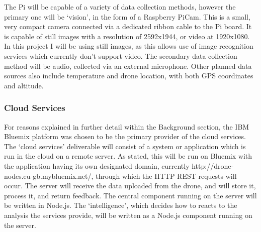 \documentclass{article}
\begin{document}
\vspace{\baselineskip} \noindent
The Pi will be capable of a variety of data collection methods, however the primary one will be `vision', in the form of a Raspberry PiCam. This is a small, very compact camera connected via a dedicated ribbon cable to the Pi board. It is capable of still images with a resolution of 2592x1944, or video at 1920x1080. In this project I will be using still images, as this allows use of image recognition services which currently don't support video. The secondary data collection method will be audio, collected via an external microphone. Other planned data sources also include temperature and drone location, with both GPS coordinates and altitude.

\subsubsection{Cloud Services}
For reasons explained in further detail within the Background section, the IBM Bluemix platform was chosen to be the primary provider of the cloud services. The `cloud services' deliverable will consist of a system or application which is run in the cloud on a remote server. As stated, this will be run on Bluemix with the application having its own designated domain, currently http://drone-nodes.eu-gb.mybluemix.net/, through which the HTTP REST requests will occur. The server will receive the data uploaded from the drone, and will store it, process it, and return feedback. The central component running on the server will be written in Node.js. The `intelligence', which decides how to reacts to the analysis the services provide, will be written as a Node.js component running on the server.
\end{document}
